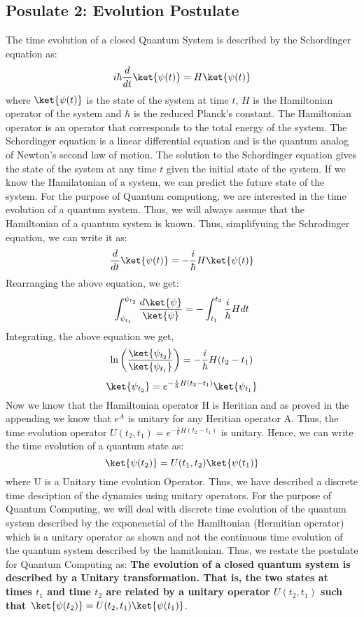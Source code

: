 \documentclass[12pt, oneside]{book}
\theoremstyle{definition}
\theoremstyle{definition}
\theoremstyle{remark}
\begin{document}
\subsection{Posulate 2: Evolution Postulate}
The time evolution of a closed Quantum System is described by the Schordinger equation as:
\[
    i\hbar\frac{d}{dt}\ket{\psi(t)}=H\ket{\psi(t)}
\]
where $\ket{\psi(t)}$ is the state of the system at time $t$, $H$ is the Hamiltonian operator of the system and $\hbar$ is the reduced Planck's constant.
The Hamiltonian operator is an operator that corresponds to the total energy of the system. The Schordinger equation is a linear differential equation and is the quantum analog of Newton's second law of motion.
The solution to the Schordinger equation gives the state of the system at any time $t$ given the initial state of the system.
If we know the Hamilatonian of a system, we can predict the future state of the system. For the purpose of Quantum computiong, we are interested in the time evolution of a quantum system. Thus, we will
always assume that the Hamiltonian of a quantum system is known. Thus, simplifyuing the Schrodinger equation, we can write it as:
\[
    \frac{d}{dt}\ket{\psi(t)}=-\frac{i}{\hbar}H\ket{\psi(t)}
\]
Rearranging the above equation, we get:
\[
    \int_{\psi_{t_1}}^{\psi_{t_2}} \frac{d\ket{\psi}}{\ket{\psi}}=-\int_{t_1}^{t_2}\frac{i}{\hbar}Hdt
\]
Integrating, the above equation we get,
\[
    \ln\left(\frac{\ket{\psi_{t_2}}}{\ket{\psi_{t_1}}}\right)=-\frac{i}{\hbar}H(t_2-t_1)
\]
\[\ket{\psi_{t_2}}=e^{-\frac{i}{\hbar}H(t_2-t_1)}\ket{\psi_{t_1}}\]
Now we know that the Hamiltonian operator H is Heritian and as proved in the appending we know that $e^{A}$ is unitary for any Heritian operator A.
Thus, the time evolution operator $U(t_2,t_1)=e^{-\frac{i}{\hbar}H(t_2-t_1)}$ is unitary.
Hence, we can write the time evolution of a quantum state as:
\[
    \ket{\psi(t_2)}=U(t_1,t_2)\ket{\psi(t_1)}
\]
where U is a Unitary time evolution Operator. Thus, we have described a discrete time desciption of the dynamics using unitary operators.
For the purpose of Quantum Computing, we will deal with discrete time evolution of the quantum system described by the exponenetial of the Hamiltonian (Hermitian operator) 
which is a unitary operator as shown and not the continuous time evolution of the quantum system described by the hamitlonian. Thus, we restate the postulate for Quantum Computing as:
\textbf{The evolution of a closed quantum system is described by a Unitary transformation. That is, the two states at times $t_1$ and time $t_2$ are related by
a unitary operator $U(t_2,t_1)$ such that $\ket{\psi(t_2)}=U(t_2,t_1)\ket{\psi(t_1)}$}.
\end{document}
